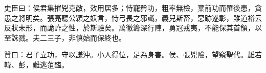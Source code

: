 \begin{pinyinscope}
 史臣曰：侯君集摧兇克敵，效用居多；恃寵矜功，粗率無檢，棄前功而罹後患，貪愚之將明矣。張亮聽公穎之妖言，恃弓長之邪讖，義兒斯畜，惡跡遂彰，雖道裕云反狀未形，而詭詐之性，於斯驗矣。萬徹籌深行陣，勇冠戎夷，不能保其首領，以至誅戮。夫二三子，非慎始而保終也。



 贊曰：君子立功，守以謙沖。小人得位，足為身害。侯、張兇險，望窺聖代。雄若韓、彭，難逃菹醢。



\end{pinyinscope}
